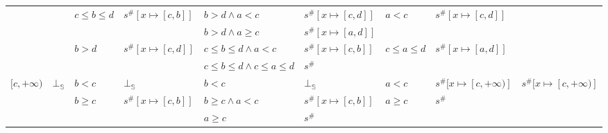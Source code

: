 \documentclass[aspectratio=169]{beamer}
\begin{document}
\begin{frame}
\begin{table}
{\begin{tabular}{|l|l|ll|ll|ll|l|}
                                        &                         & \multirow{2}{*}{$c \le b \le d$} & \multirow{2}{*}{$s^\#[x \mapsto [c, b]]$}       & $b > d \land a < c$                 & $s^\#[x \mapsto [c, d]]$ & \multirow{2}{*}{$a < c$}         & \multirow{2}{*}{$s^\#[x \mapsto [c, d]]$} &                                                 \\
                                        &                         &                                  &                                                 & $b > d \land a \ge c$               & $s^\#[x \mapsto [a, d]]$ &                                  &                                           &                                                 \\
                                        &                         & \multirow{2}{*}{$b > d$}         & \multirow{2}{*}{$s^\#[x \mapsto [c, d]]$}       & $c \le b \le d \land a < c$         & $s^\#[x \mapsto [c, b]]$ & \multirow{2}{*}{$c \le a \le d$} & \multirow{2}{*}{$s^\#[x \mapsto [a, d]]$} &                                                 \\
                                        &                         &                                  &                                                 & $c \le b \le d \land c \le a \le d$ & $s^\#$                   &                                  &                                           &                                                 \\ \hline
        \multirow{3}{*}{$[c, +\infty)$} & \multirow{3}{*}{$\bot_\mathbb{S}$} & $b < c$                          & $\bot_\mathbb{S}$                                          & $b < c$                             & $\bot_\mathbb{S}$                   & $a < c$                          & $s^\#[x \mapsto [c, +\infty)]$            & \multirow{3}{*}{$s^\#[x \mapsto [c, +\infty)]$} \\
                                        &                         & \multirow{2}{*}{$b \ge c$}       & \multirow{2}{*}{$s^\#[x \mapsto [c, b]]$}       & $b \ge c \land a < c$               & $s^\#[x \mapsto [c, b]]$ & \multirow{2}{*}{$a \ge c$}       & \multirow{2}{*}{$s^\#$}                   &                                                 \\
                                        &                         &                                  &                                                 & $a \ge c$                           & $s^\#$                   &                                  &                                           &                                                 \\ \hline

\end{tabular}}
\end{table}
\end{frame}
\end{document}

